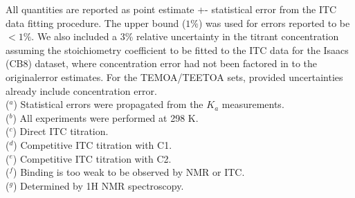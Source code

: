 \documentclass{article}
\begin{document}
All quantities are reported as point estimate +- statistical error from the ITC data fitting procedure. The upper bound ($1\%$) was used for errors reported to be $<1\%$. We also included a 3\% relative uncertainty in the titrant concentration assuming the stoichiometry coefficient to be fitted to the ITC data for the Isaacs (CB8) dataset, where concentration error had not been factored in to the originalerror estimates. For the TEMOA/TEETOA sets, provided uncertainties already include concentration error.\\
($^a$) Statistical errors were propagated from the $K_a$ measurements. \\
($^b$) All experiments were performed at 298 K. \\
($^c$) Direct ITC titration. \\
($^d$) Competitive ITC titration with C1. \\
($^e$) Competitive ITC titration with C2.\\
($^f$) Binding is too weak to be observed by NMR or ITC. \\
($^g$) Determined by 1H NMR spectroscopy.
\end{document}
